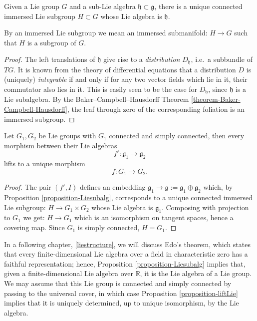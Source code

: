 \begin{proposition}
\label{proposition-Liesubalg}
 Given a Lie group $G$ and a sub-Lie algebra $\mathfrak h\subset \mathfrak g$, there is a unique connected immersed Lie subgroup $H\subset G$ whose Lie algebra is $\mathfrak h$.
\end{proposition}

By an immersed Lie subgroup we mean an immersed submanifold: $H\to G$ such that $H$ is a subgroup of $G$.


\begin{proof}
 The left translations of $\mathfrak h$ give rise to a \emph{distribution} $D_{\mathfrak h}$, i.e.\ a subbundle of $TG$. It is known from the theory of differential equations that a distribution $D$ is (uniquely) \emph{integrable} if and only if for any two vector fields which lie in it, their commutator also lies in it. This is easily seen to be the case for $D_{\mathfrak h}$, since $\mathfrak h$ is a Lie subalgebra. By the Baker--Campbell--Hausdorff Theorem \ref{theorem-Baker-Campbell-Hausdorff}, the leaf through zero of the corresponding foliation is an immersed subgroup.
\end{proof}


\begin{proposition}
\label{proposition-liftLie}
 Let $G_1, G_2$ be Lie groups with $G_1$ connected and simply connected, then every morphism between their Lie algebras 
 $$f':\mathfrak g_1\to\mathfrak g_2$$ 
 lifts to a unique morphism 
 $$f: G_1\to G_2.$$
\end{proposition}


\begin{proof}
The pair $(f', I)$ defines an embedding $\mathfrak g_1\to \mathfrak g:=\mathfrak g_1\oplus \mathfrak g_2$ which, by Proposition \ref{proposition-Liesubalg}, corresponds to a unique connected immersed Lie subgroup: $H\to G_1\times G_2$ whose Lie algebra is $\mathfrak g_1$. Composing with projection to $G_1$ we get: $H\to G_1$ which is an isomorphism on tangent spaces, hence a covering map. Since $G_1$ is simply connected, $H=G_1$. 
\end{proof}


\begin{remark}
 \label{remark-existsgroup}
In a following chapter, \ref{liestructure}, we will discuss Edo's theorem, which states that every finite-dimensional Lie algebra over a field in characteristic zero has a faithful representation; hence, Proposition \ref{proposition-Liesubalg} implies that, given a finite-dimensional Lie algebra over $\mathbb R$, it is the Lie algebra of a Lie group. We may assume that this Lie group is connected and simply connected by passing to the universal cover, in which case Proposition \ref{proposition-liftLie} implies that it is uniquely determined, up to unique isomorphism, by the Lie algebra.
\end{remark}






